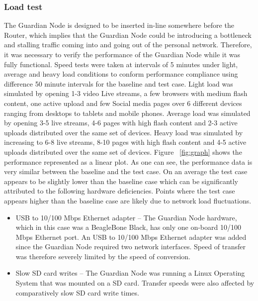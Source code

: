 \subsubsection{Load test}
\label{sec:eval:loadtest}
The Guardian Node is designed to be inserted in-line somewhere before the Router, which implies that the Guardian Node could be introducing a bottleneck and stalling traffic coming into and going out of the personal network. Therefore, it was necessary to verify the performance of the Guardian Node while it was fully functional. Speed tests were taken at intervals of 5 minutes under light, average and heavy load conditions to conform performance compliance using difference 50 minute intervals for the baseline and test case. Light load was simulated by opening 1-3 video Live streams, a few browsers with medium flash content, one active upload and few Social media pages over 6 different devices ranging from desktops to tablets and mobile phones. Average load was simulated by opening 3-5 live streams, 4-6 pages with high flash content and 2-3 active uploads distributed over the same set of devices. Heavy load was simulated by increasing to 6-8 live streams, 8-10 pages with high flash content and 4-5 active uploads distributed over the same set of devices. Figure ~\ref{fig:graph} shows the performance represented as a linear plot. As one can see, the performance data is very similar between the baseline and the test case. On an average the test case appears to be slightly lower than the baseline case which can be significantly attributed to the following hardware deficiencies. Points where the test case appears higher than the baseline case are likely due to network load fluctuations.
\begin{itemize}
    \item USB to 10/100 Mbps Ethernet adapter --
    The Guardian Node hardware, which in this case was a BeagleBone Black, has only one on-board 10/100 Mbps Ethernet port. An USB to 10/100 Mbps Ethernet adapter was added since the Guardian Node required two network interfaces. Speed of transfer was therefore severely limited by the speed of conversion.
    \item Slow SD card writes --
    The Guardian Node was running a Linux Operating System that was mounted on a SD card. Transfer speeds were also affected by comparatively slow SD card write times.
\end{itemize}


